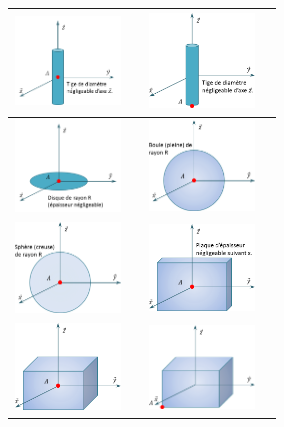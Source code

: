 \documentclass[10pt,fleqn]{article} %
\begin{document}
\begin{center}
\begin{tabular}{|c|p{2cm}||c|p{2cm}|}
\hline 
\includegraphics[width=2.8cm]{images/qcm/Fig_01} & & \includegraphics[width=2.8cm]{images/qcm/Fig_02} & \\ \hline
\includegraphics[width=2.8cm]{images/qcm/Fig_04} & & \includegraphics[width=2.8cm]{images/qcm/Fig_05} & \\ \hline
\includegraphics[width=2.8cm]{images/qcm/Fig_06} & & \includegraphics[width=2.8cm]{images/qcm/Fig_07} & \\ \hline
\includegraphics[width=2.8cm]{images/qcm/Fig_08} & & \includegraphics[width=2.8cm]{images/qcm/Fig_09} & \\ \hline

\end{tabular}
\end{center}
\end{document}
